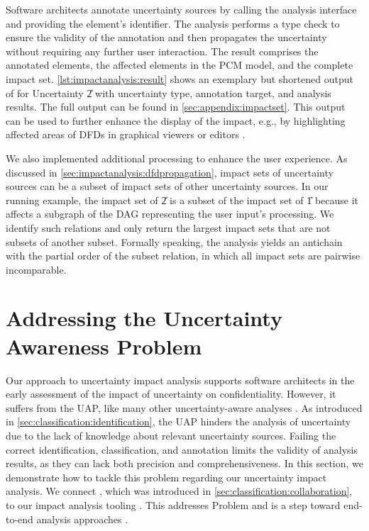 Software architects annotate uncertainty sources by calling the analysis interface and providing the element's identifier.
The analysis performs a type check to ensure the validity of the annotation and then propagates the uncertainty without requiring any further user interaction.
The result comprises the annotated elements, the affected elements in the \ac{PCM} model, and the complete impact set.
\autoref{lst:impactanalysis:result} shows an exemplary but shortened output of \uia for Uncertainty \U{2} with uncertainty type, annotation target, and analysis results.
The full output can be found in \autoref{sec:appendix:impactset}.
This output can be used to further enhance the display of the impact, e.g., by highlighting affected areas of \acp{DFD} in graphical viewers or editors \cite{boltz_extensible_2024}.

We also implemented additional processing to enhance the user experience.
As discussed in \autoref{sec:impactanalysis:dfdpropagation}, impact sets of uncertainty sources can be a subset of impact sets of other uncertainty sources.
In our running example, the impact set of \U{2} is a subset of the impact set of \U{1} because it affects a subgraph of the \ac{DAG} representing the user input's processing.
We identify such relations and only return the largest impact sets that are not subsets of another subset.
Formally speaking, the analysis yields an antichain \cite{diestel_graph_2017} with the partial order of the subset relation, in which all impact sets are pairwise incomparable.






\section{Addressing the Uncertainty Awareness Problem}%
\label{sec:impactanalysis:awareness}

Our approach to uncertainty impact analysis supports software architects in the early assessment of the impact of uncertainty on confidentiality.
However, it suffers from the \acf{UAP}, like many other uncertainty-aware analyses \cite{hezavehi_uncertainty_2021}.
As introduced in \autoref{sec:classification:identification}, the \ac{UAP} hinders the analysis of uncertainty due to the lack of knowledge about relevant uncertainty sources.
Failing the correct identification, classification, and annotation limits the validity of analysis results, as they can lack both precision and comprehensiveness.
In this section, we demonstrate how to tackle this problem regarding our uncertainty impact analysis.
We connect \arcen, which was introduced in \autoref{sec:classification:collaboration}, to our impact analysis tooling \uia.
This addresses Problem  and is a step toward end-to-end analysis approaches \cite{weyns_towards_2023}.

